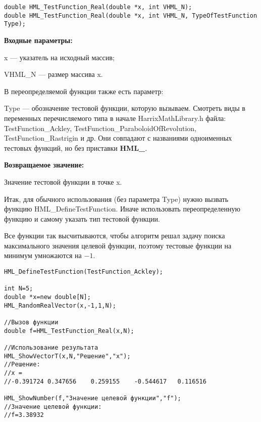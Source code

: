 \documentclass[a4paper,12pt]{article}
\begin{document}
\begin{lstlisting}[label=code_syntax_HML_TestFunction_Real,caption=Синтаксис]
double HML_TestFunction_Real(double *x, int VHML_N);
double HML_TestFunction_Real(double *x, int VHML_N, TypeOfTestFunction Type);
\end{lstlisting}

\textbf{Входные параметры:}

x --- указатель на исходный массив;

VHML\_N --- размер массива x.

В переопределяемой функции также есть параметр:
  
Type --- обозначение тестовой функции, которую вызываем.
Смотреть виды в переменных перечисляемого типа в начале HarrixMathLibrary.h файла: TestFunction\_Ackley, TestFunction\_ParaboloidOfRevolution, TestFunction\_Rastrigin и др. Они совпадают с названиями одноименных тестовых функций, но без приставки \textbf{HML\_}.

\textbf{Возвращаемое значение:}
 
Значение тестовой функции в точке x.

Итак, для обычного использования (без параметра Type) нужно вызвать функцию HML\_DefineTestFunction. Иначе использовать переопределенную функцию и самому указать тип тестовой функции.

Все функции так высчитываются, чтобы алгоритм решал задачу поиска максимального значения целевой функции, поэтому тестовые функции на минимум умножаются на $-1$.


\begin{lstlisting}[label=code_use_HML_TestFunction_Real,caption=Пример использования]
HML_DefineTestFunction(TestFunction_Ackley);

int N=5;
double *x=new double[N];
HML_RandomRealVector(x,-1,1,N);

//Вызов функции
double f=HML_TestFunction_Real(x,N);

//Использование результата
HML_ShowVectorT(x,N,"Решение","x");
//Решение:
//x =
//-0.391724	0.347656	0.259155	-0.544617	0.116516

HML_ShowNumber(f,"Значение целевой функции","f");
//Значение целевой функции:
//f=3.38932
\end{lstlisting}

\end{document}
